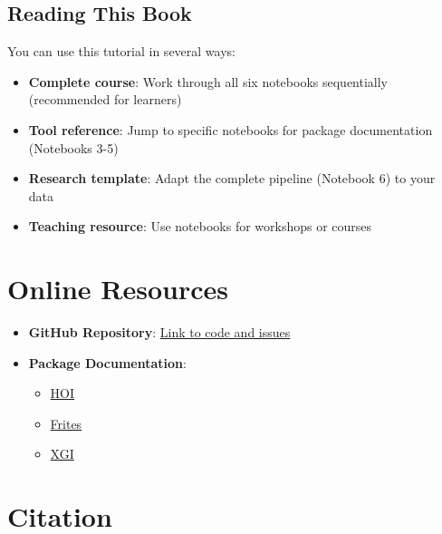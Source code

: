\documentclass[
  11pt,
  letterpaper,
  oneside,
  openany]{book}
\providecommand{\tightlist}{%
  \setlength{\itemsep}{0pt}\setlength{\parskip}{0pt}}
\begin{document}
\subsection*{Reading This Book}\label{reading-this-book}

You can use this tutorial in several ways:

\begin{itemize}
\tightlist
\item
  \textbf{Complete course}: Work through all six notebooks sequentially
  (recommended for learners)
\item
  \textbf{Tool reference}: Jump to specific notebooks for package
  documentation (Notebooks 3-5)
\item
  \textbf{Research template}: Adapt the complete pipeline (Notebook 6)
  to your data
\item
  \textbf{Teaching resource}: Use notebooks for workshops or courses
\end{itemize}

\section*{Online Resources}\label{online-resources}


\begin{itemize}
\tightlist
\item
  \textbf{GitHub Repository}:
  \href{https://github.com/yourusername/repo}{Link to code and issues}
\item
  \textbf{Package Documentation}:

  \begin{itemize}
  \tightlist
  \item
    \href{https://hoi.readthedocs.io/}{HOI}
  \item
    \href{https://brainets.github.io/frites/}{Frites}
  \item
    \href{https://xgi.readthedocs.io/}{XGI}
  \end{itemize}
\end{itemize}

\section*{Citation}\label{citation}

\end{document}
